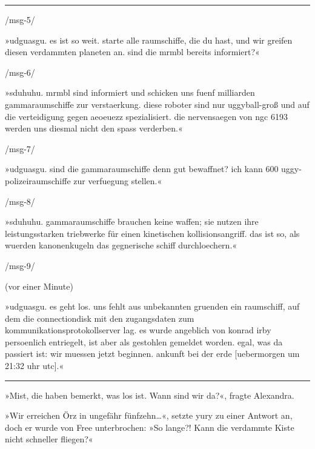 \noindent \parbox{\textwidth}{ \vspace{3ex} \hrule \vspace{3ex}

    \begin{footnotesize}
    \begin{ttfamily}

\noindent /msg-5/

\noindent »udguasgu. es ist so weit. starte alle raumschiffe, die du hast, und wir greifen diesen verdammten planeten an. sind die mrmbl bereits informiert?«

\noindent /msg-6/

\noindent »sduhuhu. mrmbl sind informiert und schicken uns fuenf milliarden gammaraumschiffe zur verstaerkung. diese roboter sind nur uggyball-groß und auf die verteidigung gegen aeoeuezz spezialisiert. die nervensaegen von ngc 6193 werden uns diesmal nicht den spass verderben.«

\noindent /msg-7/

\noindent »udguasgu. sind die gammaraumschiffe denn gut bewaffnet? ich kann 600 uggy-polizeiraumschiffe zur verfuegung stellen.«

\noindent /msg-8/

\noindent »sduhuhu. gammaraumschiffe brauchen keine waffen; sie nutzen ihre leistungsstarken triebwerke für einen kinetischen kollisionsangriff. das ist so, als wuerden kanonenkugeln das gegnerische schiff durchloechern.«

\noindent /msg-9/

\noindent (vor einer Minute)

\noindent »udguasgu. es geht los. uns fehlt aus unbekannten gruenden ein raumschiff, auf dem die connectiondisk mit den zugangsdaten zum kommunikationsprotokollserver lag. es wurde angeblich von konrad irby persoenlich entriegelt, ist aber als gestohlen gemeldet worden. egal, was da passiert ist: wir muessen jetzt beginnen. ankunft bei der erde [uebermorgen um 21:32 uhr utc].«

    \end{ttfamily}
    \end{footnotesize}

\vspace{3ex} \hrule \vspace{3ex} }

»Mist, die haben bemerkt, was los ist. Wann sind wir da?«, fragte Alexandra.

»Wir erreichen Örz in ungefähr fünfzehn…«, setzte yury zu einer Antwort an, doch er wurde von Free unterbrochen: »So lange?! Kann die verdammte Kiste nicht schneller fliegen?«

